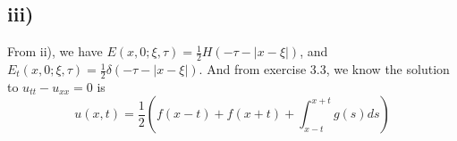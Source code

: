 \documentclass[a4paper, 11pt]{article}
\begin{document}
\begin{spacing}{1.5}
\subsection*{iii)}
From ii), we have $E(x,0;\xi,\tau) = \frac{1}{2} H(-\tau-|x-\xi|)$, and $ E_t(x,0;\xi,\tau) = \frac{1}{2}\delta(-\tau-|x-\xi|)$. And from exercise 3.3, we know the solution to $u_{tt} - u_{xx} =0$ is 
$$
    u(x,t) = \frac{1}{2} \left( f(x-t) + f(x+t) + \int_{x-t}^{x+t} g(s) ds \right) 
$$








\end{spacing}
\end{document}

